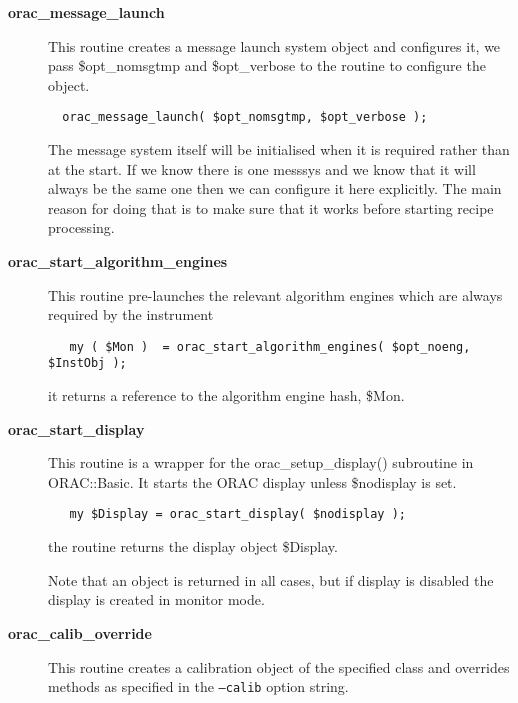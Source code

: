 \begin{description}
\item[{\textbf{orac\_message\_launch}}] \mbox{}

This routine creates a message launch system object and configures it,
we pass \$opt\_nomsgtmp and \$opt\_verbose to the routine to configure the
object.

\begin{verbatim}
  orac_message_launch( $opt_nomsgtmp, $opt_verbose );
\end{verbatim}


The message system itself will be initialised when it is required
rather than at the start. If we know there is one messsys and we know
that it will always be the same one then we can configure it here
explicitly. The main reason for doing that is to make sure that it
works before starting recipe processing.


\item[{\textbf{orac\_start\_algorithm\_engines}}] \mbox{}

This routine pre-launches the relevant algorithm engines which are always required by the instrument

\begin{verbatim}
   my ( $Mon )  = orac_start_algorithm_engines( $opt_noeng, $InstObj );
\end{verbatim}


it returns a reference to the algorithm engine hash, \$Mon.


\item[{\textbf{orac\_start\_display}}] \mbox{}

This routine is a wrapper for the orac\_setup\_display() subroutine in
ORAC::Basic. It starts the ORAC display unless \$nodisplay is
set.

\begin{verbatim}
   my $Display = orac_start_display( $nodisplay );
\end{verbatim}


the routine returns the display object \$Display.



Note that an object is returned in all cases, but if display
is disabled the display is created in monitor mode.


\item[{\textbf{orac\_calib\_override}}] \mbox{}

This routine creates a calibration object of the specified class and
overrides methods as specified in the \texttt{--calib} option string.


\end{description}
